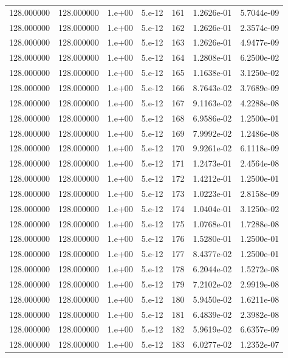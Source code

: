 \begin{table}[htbp]
\begin{tabular}{rrrrrrr}
128.000000 & 128.000000 & 1.e+00 & 5.e-12 & 161 & 1.2626e-01 & 5.7044e-09 \\
128.000000 & 128.000000 & 1.e+00 & 5.e-12 & 162 & 1.2626e-01 & 2.3574e-09 \\
128.000000 & 128.000000 & 1.e+00 & 5.e-12 & 163 & 1.2626e-01 & 4.9477e-09 \\
128.000000 & 128.000000 & 1.e+00 & 5.e-12 & 164 & 1.2808e-01 & 6.2500e-02 \\
128.000000 & 128.000000 & 1.e+00 & 5.e-12 & 165 & 1.1638e-01 & 3.1250e-02 \\
128.000000 & 128.000000 & 1.e+00 & 5.e-12 & 166 & 8.7643e-02 & 3.7689e-09 \\
128.000000 & 128.000000 & 1.e+00 & 5.e-12 & 167 & 9.1163e-02 & 4.2288e-08 \\
128.000000 & 128.000000 & 1.e+00 & 5.e-12 & 168 & 6.9586e-02 & 1.2500e-01 \\
128.000000 & 128.000000 & 1.e+00 & 5.e-12 & 169 & 7.9992e-02 & 1.2486e-08 \\
128.000000 & 128.000000 & 1.e+00 & 5.e-12 & 170 & 9.9261e-02 & 6.1118e-09 \\
128.000000 & 128.000000 & 1.e+00 & 5.e-12 & 171 & 1.2473e-01 & 2.4564e-08 \\
128.000000 & 128.000000 & 1.e+00 & 5.e-12 & 172 & 1.4212e-01 & 1.2500e-01 \\
128.000000 & 128.000000 & 1.e+00 & 5.e-12 & 173 & 1.0223e-01 & 2.8158e-09 \\
128.000000 & 128.000000 & 1.e+00 & 5.e-12 & 174 & 1.0404e-01 & 3.1250e-02 \\
128.000000 & 128.000000 & 1.e+00 & 5.e-12 & 175 & 1.0768e-01 & 1.7288e-08 \\
128.000000 & 128.000000 & 1.e+00 & 5.e-12 & 176 & 1.5280e-01 & 1.2500e-01 \\
128.000000 & 128.000000 & 1.e+00 & 5.e-12 & 177 & 8.4377e-02 & 1.2500e-01 \\
128.000000 & 128.000000 & 1.e+00 & 5.e-12 & 178 & 6.2044e-02 & 1.5272e-08 \\
128.000000 & 128.000000 & 1.e+00 & 5.e-12 & 179 & 7.2102e-02 & 2.9919e-08 \\
128.000000 & 128.000000 & 1.e+00 & 5.e-12 & 180 & 5.9450e-02 & 1.6211e-08 \\
128.000000 & 128.000000 & 1.e+00 & 5.e-12 & 181 & 6.4839e-02 & 2.3982e-08 \\
128.000000 & 128.000000 & 1.e+00 & 5.e-12 & 182 & 5.9619e-02 & 6.6357e-09 \\
128.000000 & 128.000000 & 1.e+00 & 5.e-12 & 183 & 6.0277e-02 & 1.2352e-07 \\

\end{tabular}
\end{table}
